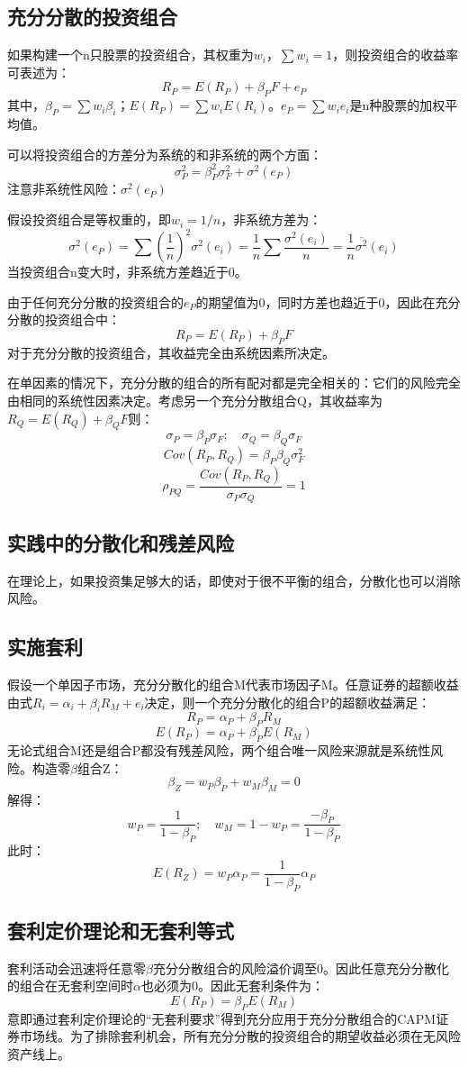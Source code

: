 \documentclass{article}
\begin{document}
\subsection{充分分散的投资组合}
如果构建一个n只股票的投资组合，其权重为$ w_i $，$ \sum w_i=1 $，则投资组合的收益率可表述为：
\[
R_P=E(R_P)+\beta_PF+e_P
\]
其中，$ \beta_P=\sum w_i\beta_i $；$ E(R_P)=\sum w_iE(R_i) $。$ e_P=\sum w_ie_i $是n种股票的加权平均值。

可以将投资组合的方差分为系统的和非系统的两个方面：
\[
\sigma^2_P=\beta_P^2\sigma_F^2+\sigma^2(e_P)
\]
注意非系统性风险：$ \sigma^2(e_P) $

假设投资组合是等权重的，即$ w_i=1/n $，非系统方差为：
\[
\sigma^2(e_P)=\sum(\frac{1}{n})^2\sigma^2(e_i)=\frac{1}{n}\sum\frac{\sigma^2(e_i)}{n}=\frac{1}{n}\overline{\sigma^2}(e_i)
\]
当投资组合n变大时，非系统方差趋近于0。

由于任何充分分散的投资组合的$ e_P $的期望值为0，同时方差也趋近于0，因此在充分分散的投资组合中：
\[
R_P=E(R_P)+\beta_PF
\]
对于充分分散的投资组合，其收益完全由系统因素所决定。

在单因素的情况下，充分分散的组合的所有配对都是完全相关的：它们的风险完全由相同的系统性因素决定。考虑另一个充分分散组合Q，其收益率为$ R_Q=E(R_Q)+\beta_QF $则：
\[
\sigma_P=\beta_P\sigma_F;\quad\sigma_Q=\beta_Q\sigma_F
\]
\[
Cov(R_P,R_Q)=\beta_P\beta_Q\sigma^2_F
\]
\[
\rho_{PQ}=\frac{Cov(R_P,R_Q)}{\sigma_P\sigma_Q}=1
\]

\subsection{实践中的分散化和残差风险}
在理论上，如果投资集足够大的话，即使对于很不平衡的组合，分散化也可以消除风险。

\subsection{实施套利}
假设一个单因子市场，充分分散化的组合M代表市场因子M。任意证券的超额收益由式$ R_i=\alpha_i+\beta_iR_M+e_i $决定，则一个充分分散化的组合P的超额收益满足：
\[
R_P=\alpha_P+\beta_PR_M
\]
\[
E(R_P)=\alpha_P+\beta_PE(R_M
)
\]
无论式组合M还是组合P都没有残差风险，两个组合唯一风险来源就是系统性风险。构造零$\beta$组合Z：
\[
\beta_Z=w_P\beta_P+w_M\beta_M=0
\]
解得：
\[
w_P=\frac{1}{1-\beta_P};\quad w_M=1-w_P=\frac{-\beta_P}{1-\beta_P}
\]
此时：
\[
E(R_Z)=w_P\alpha_P=\frac{1}{1-\beta_P}\alpha_P
\]

\subsection{套利定价理论和无套利等式}
套利活动会迅速将任意零$\beta$充分分散组合的风险溢价调至0。因此任意充分分散化的组合在无套利空间时$\alpha$也必须为0。因此无套利条件为：
\[
E(R_P)=\beta_PE(R_M)
\]
意即通过套利定价理论的“无套利要求”得到充分应用于充分分散组合的CAPM证券市场线。为了排除套利机会，所有充分分散的投资组合的期望收益必须在无风险资产线上。
\end{document}
